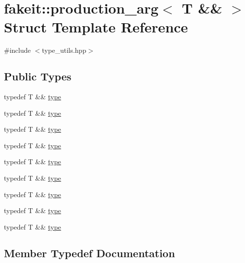 \hypertarget{structfakeit_1_1production__arg_3_01T_01_6_6_01_4}{}\section{fakeit\+::production\+\_\+arg$<$ T \&\& $>$ Struct Template Reference}
\label{structfakeit_1_1production__arg_3_01T_01_6_6_01_4}


{\ttfamily \#include $<$type\+\_\+utils.\+hpp$>$}

\subsection*{Public Types}
\begin{DoxyCompactItemize}
\item 
typedef T \&\& \mbox{\hyperlink{structfakeit_1_1production__arg_3_01T_01_6_6_01_4_a1ce2514bf255660146105552a1bd9bad}{type}}
\item 
typedef T \&\& \mbox{\hyperlink{structfakeit_1_1production__arg_3_01T_01_6_6_01_4_a1ce2514bf255660146105552a1bd9bad}{type}}
\item 
typedef T \&\& \mbox{\hyperlink{structfakeit_1_1production__arg_3_01T_01_6_6_01_4_a1ce2514bf255660146105552a1bd9bad}{type}}
\item 
typedef T \&\& \mbox{\hyperlink{structfakeit_1_1production__arg_3_01T_01_6_6_01_4_a1ce2514bf255660146105552a1bd9bad}{type}}
\item 
typedef T \&\& \mbox{\hyperlink{structfakeit_1_1production__arg_3_01T_01_6_6_01_4_a1ce2514bf255660146105552a1bd9bad}{type}}
\item 
typedef T \&\& \mbox{\hyperlink{structfakeit_1_1production__arg_3_01T_01_6_6_01_4_a1ce2514bf255660146105552a1bd9bad}{type}}
\item 
typedef T \&\& \mbox{\hyperlink{structfakeit_1_1production__arg_3_01T_01_6_6_01_4_a1ce2514bf255660146105552a1bd9bad}{type}}
\item 
typedef T \&\& \mbox{\hyperlink{structfakeit_1_1production__arg_3_01T_01_6_6_01_4_a1ce2514bf255660146105552a1bd9bad}{type}}
\item 
typedef T \&\& \mbox{\hyperlink{structfakeit_1_1production__arg_3_01T_01_6_6_01_4_a1ce2514bf255660146105552a1bd9bad}{type}}
\end{DoxyCompactItemize}


\subsection{Member Typedef Documentation}
\mbox{\label{structfakeit_1_1production__arg_3_01T_01_6_6_01_4_a1ce2514bf255660146105552a1bd9bad}} 
